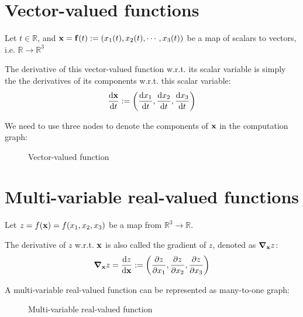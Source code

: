\documentclass[11pt]{article}
\newcommand{\numset}[1]{\mathbb{#1}}
\begin{document}
\section{Vector-valued functions}
Let $t \in \numset{R}$, and $\vb{x} = \vb{f}(t) := \qty(x_1(t), x_2(t), \cdots, x_3(t))$ be a  map of scalars to vectors, i.e. $\numset{R} \rightarrow \numset{R}^3$ 

The derivative of this vector-valued function w.r.t. its scalar variable is simply the the derivatives of its components w.r.t. this scalar variable:
\begin{align}
	\dv{\vb{x}}{t} := \qty(\dv{x_1}{t}, \dv{x_2}{t}, \dv{x_3}{t})
\end{align}

We need to use three nodes to denote the components of $\vb{x}$ in the computation graph:
\begin{figure}[h]
	\centering
		\caption{Vector-valued function}
	\label{fig:vector-valued-function}
\end{figure}

\section{Multi-variable real-valued functions}
Let $z = f(\vb{x}) = f(x_1, x_2, x_3)$ be a map from $\numset{R}^3 \rightarrow \numset{R}$.

The derivative of $z$ w.r.t. $\vb{x}$ is also called the gradient of $z$, denoted as $\grad_{\vb{x}}{z}$:
\begin{align}
	\grad_{\vb{x}}{z} = \dv{z}{\vb{x}} := \qty(\pdv{z}{x_1}, \pdv{z}{x_2}, \pdv{z}{x_3})
\end{align}

A multi-variable real-valued function can be represented as many-to-one graph:
\begin{figure}[h]
		\centering
		\caption{Multi-variable real-valued function}
		\label{fig:multi-variable-real-valued-function}
\end{figure}
\end{document}

